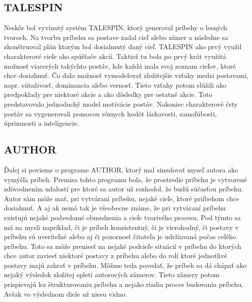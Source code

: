 \subsection{TALESPIN}
Neskôr bol vyvinutý systém TALESPIN, ktorý generoval príbehy o lesných tvoroch. Na tvorbu príbehu sa postave zadal cieľ alebo zámer a následne sa zkonštruoval plán ktorým bol dosiahnutý daný cieľ. TALESPIN ako prvý využil charakterové cieľe ako spúšťače akcií. Taktiež tu bola po prvý krát využitá možnosť viacerých takýchto postáv, kde každá mala svoj zoznam cieľov, ktoré chce dosiahnuť. Čo dalo možnosť vymodelovať zložitejšie vzťahy medzi postavami, napr. sútaživosť, dominancia alebo vernosť. Tieto vzťahy potom slúžili ako predpoklady pre niektoré akcie a ako dôsledky pre ostatné akcie. Toto predstavovalo jednoduchý model motivácie postáv. Nakoniec charakterové črty postáv sa vygenerovali pomocou rôznych hodôt láskavosti, samoľúbosti, úprimnosti a inteligencie.\par
\subsection{AUTHOR}
Ďalej si povieme o programe AUTHOR, ktorý mal simulovať myseľ autora ako vymýšľa príbeh. Premisa tohto programu bola, že prostredie príbehu je vytvorené zdôvodnením udalostí pre ktoré sa autor už rozhodol, že budú súčasťou príbehu. Autor sám môže mať, pri vytváraní príbehu, nejaké cieľe, ktoré priíbehom chce dosiahnuť. A aj ak nemá tak je všeobecne známe, že pri vytváraní príbehu existujú nejaké podvedomé obmedzenia a cieľe tvorivého procesu. Pod týmto sa má na mysli napríklad, či je príbeh konzistentný, či je vierohodný, či postavy v príbehu sú uveriteľné alebo aj či pozornosť čitateľa je udržiavaná počas celého príbehu. Toto sa môže preniesť na nejaké podcieľe situácií v príbehu do ktorých chce autor zaviesť niektoré postavy z príbehu alebo do rolí ktoré jednotlivé postavy majú zahrať v príbehu. Môžme teda povedať, že príbeh sa dá chápať ako nejaký výsledok zložitej spleti autorových zámerov. Tieto zámery potom prispievajú ku štrukturovaniu príbehu a nejako riadia proces budovania príbehu. Avšak vo výslednom diele už niesu vidno.\par
